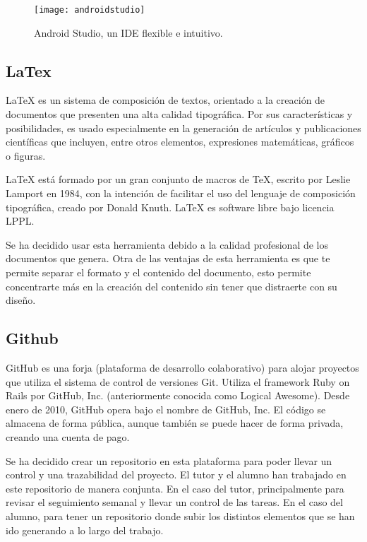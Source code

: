 \begin{figure}[h]
    \centering
    \texttt{[image: androidstudio]}
    \caption{Android Studio, un IDE flexible e intuitivo.}
    \label{fig:androidstudio}
\end{figure}

\subsection{LaTex}

LaTeX \cite{URL::LaTeX} es un sistema de composición de textos, orientado a la creación de documentos que presenten una alta calidad tipográfica. Por sus características y posibilidades, es usado especialmente en la generación de artículos y publicaciones científicas que incluyen, entre otros elementos, expresiones matemáticas, gráficos o figuras.

LaTeX está formado por un gran conjunto de macros de TeX, escrito por Leslie Lamport en 1984, con la intención de facilitar el uso del lenguaje de composición tipográfica, creado por Donald Knuth. LaTeX es software libre bajo licencia LPPL.

Se ha decidido usar esta herramienta debido a la calidad profesional de los documentos que genera. Otra de las ventajas de esta herramienta es que te permite separar el formato y el contenido del documento, esto permite concentrarte más en la creación del contenido sin tener que distraerte con su diseño.

\vskip 0.5in

\subsection{Github}

GitHub \cite{URL::Github} es una forja (plataforma de desarrollo colaborativo) para alojar proyectos que utiliza el sistema de control de versiones Git. Utiliza el framework Ruby on Rails por GitHub, Inc.  (anteriormente conocida como Logical Awesome). Desde enero de 2010, GitHub opera bajo el nombre de GitHub, Inc. El código se almacena de forma pública, aunque también se puede hacer de forma privada, creando una cuenta de pago.

Se ha decidido crear un repositorio \cite{URL::repositorioAplicacion} en esta plataforma para poder llevar un control y una trazabilidad del proyecto. El tutor y el alumno han trabajado en este repositorio de manera conjunta. En el caso del tutor, principalmente para revisar el seguimiento semanal y llevar un control de las tareas. En el caso del alumno, para tener un repositorio donde subir los distintos elementos que se han ido generando a lo largo del trabajo. 

